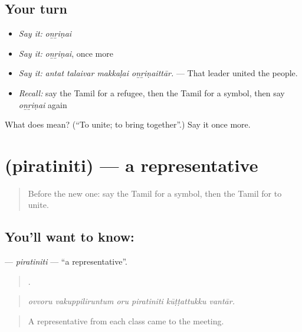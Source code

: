 \subsection*{Your turn}
\begin{itemize}
\raggedright
  \item \emph{Say it:} \emph{oṉṟiṇai}
  \item \emph{Say it:} \emph{oṉṟiṇai}, once more
  \item \emph{Say it:} \emph{antat talaivar makkaḷai oṉṟiṇaittār.} — That leader united the people.
  \item \emph{Recall:} say the Tamil for a refugee, then the Tamil for a symbol, then say \emph{oṉṟiṇai} again
\end{itemize}

\begin{tcolorbox}[breakable,colback=teal!4,colframe=teal!35!black,title={Before you move on}]
What does  mean? (\textquotedblleft{}To unite; to bring together\textquotedblright{}.) Say it once more.
\end{tcolorbox}
\section[\texorpdfstring{\ta{பிரதிநிதி} (piratiniti)}{பிரதிநிதி (piratiniti)}]{ (piratiniti) — a representative}

\label{lesson:TA-C381-piratiniti}



\begin{quote}
Before the new one: say the Tamil for a symbol, then the Tamil for to unite.
\end{quote}

\subsection*{You'll want to know: }
\textbf{} — \emph{piratiniti} — \textquotedblleft{}a representative\textquotedblright{}.

\begin{quote}
     .
\end{quote}

\begin{quote}
\emph{ovvoru vakuppiliruntum oru piratiniti kūṭṭattukku vantār.}
\end{quote}

\begin{quote}
A representative from each class came to the meeting.
\end{quote}

